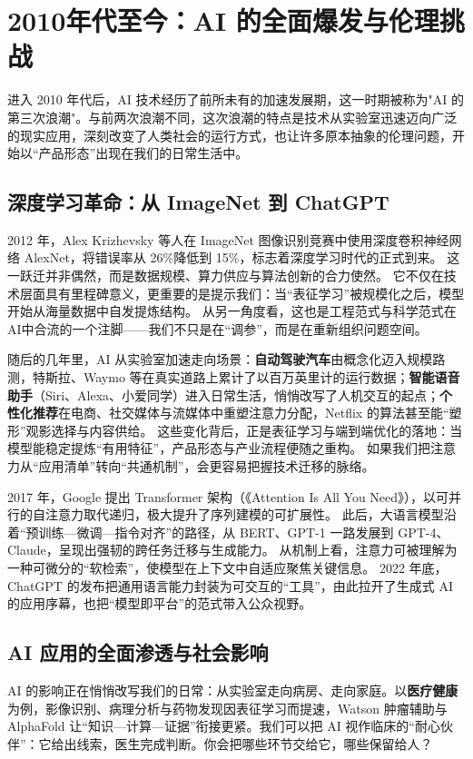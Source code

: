 \section{2010年代至今：AI 的全面爆发与伦理挑战}

进入 2010 年代后，AI 技术经历了前所未有的加速发展期，这一时期被称为"AI 的第三次浪潮"。与前两次浪潮不同，这次浪潮的特点是技术从实验室迅速迈向广泛的现实应用，深刻改变了人类社会的运行方式，也让许多原本抽象的伦理问题，开始以“产品形态”出现在我们的日常生活中。

\subsection{深度学习革命：从 ImageNet 到 ChatGPT}

2012 年，Alex Krizhevsky 等人在 ImageNet 图像识别竞赛中使用深度卷积神经网络 AlexNet，将错误率从 26\%降低到 15\%，标志着深度学习时代的正式到来。 
这一跃迁并非偶然，而是数据规模、算力供应与算法创新的合力使然。 
它不仅在技术层面具有里程碑意义，更重要的是提示我们：当“表征学习”被规模化之后，模型开始从海量数据中自发提炼结构。 
从另一角度看，这也是工程范式与科学范式在AI中合流的一个注脚——我们不只是在“调参”，而是在重新组织问题空间。

随后的几年里，AI 从实验室加速走向场景：{\bf 自动驾驶汽车}由概念化迈入规模路测，特斯拉、Waymo 等在真实道路上累计了以百万英里计的运行数据；{\bf 智能语音助手}（Siri、Alexa、小爱同学）进入日常生活，悄悄改写了人机交互的起点；{\bf 个性化推荐}在电商、社交媒体与流媒体中重塑注意力分配，Netflix 的算法甚至能“塑形”观影选择与内容供给。 
这些变化背后，正是表征学习与端到端优化的落地：当模型能稳定提炼“有用特征”，产品形态与产业流程便随之重构。 
如果我们把注意力从“应用清单”转向“共通机制”，会更容易把握技术迁移的脉络。

2017 年，Google 提出 Transformer 架构（《Attention Is All You Need》），以可并行的自注意力取代递归，极大提升了序列建模的可扩展性。 
此后，大语言模型沿着“预训练—微调—指令对齐”的路径，从 BERT、GPT-1 一路发展到 GPT-4、Claude，呈现出强韧的跨任务迁移与生成能力。 
从机制上看，注意力可被理解为一种可微分的“软检索”，使模型在上下文中自适应聚焦关键信息。 
2022 年底，ChatGPT 的发布把通用语言能力封装为可交互的“工具”，由此拉开了生成式 AI 的应用序幕，也把“模型即平台”的范式带入公众视野。

\subsection{AI 应用的全面渗透与社会影响}

AI 的影响正在悄悄改写我们的日常：从实验室走向病房、走向家庭。以{\bf 医疗健康}为例，影像识别、病理分析与药物发现因表征学习而提速，Watson 肿瘤辅助与 AlphaFold 让“知识—计算—证据”衔接更紧。我们可以把 AI 视作临床的“耐心伙伴”：它给出线索，医生完成判断。你会把哪些环节交给它，哪些保留给人？

